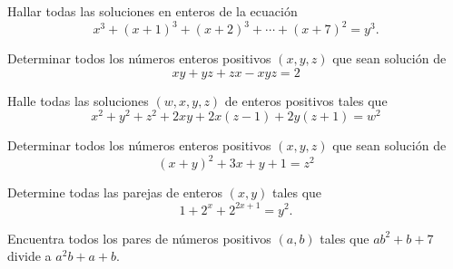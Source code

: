 \begin{exercise}
    Hallar todas las soluciones en enteros de la ecuación
    \[
        x^3 + (x + 1)^3 + (x + 2)^3 + \cdots + (x + 7)^2 = y^3.
    \]
\end{exercise}

\begin{exercise}
    Determinar todos los números enteros positivos $(x,y,z)$ que sean solución de
    \[
        xy + yz + zx - xyz = 2
    \]
\end{exercise}

\begin{exercise}
    Halle todas las soluciones $(w,x,y,z)$ de enteros positivos tales que
    \[
        x^2 + y^2 + z^2 + 2xy + 2x(z - 1) + 2y(z + 1) = w^2
    \]
\end{exercise}

\begin{exercise}
    Determinar todos los números enteros positivos $(x,y,z)$ que sean solución de
    \[
        (x + y)^2 + 3x + y + 1 = z^2
    \]
\end{exercise}

\begin{exercise}
    Determine todas las parejas de enteros $(x, y)$ tales que
    \[
        1 + 2^x + 2^{2x + 1} = y^2.
    \]
\end{exercise}

\begin{problem}
    Encuentra todos los pares de números positivos $(a, b)$ tales que $ab^2 + b + 7$ divide a $a^2 b + a + b$.
\end{problem}